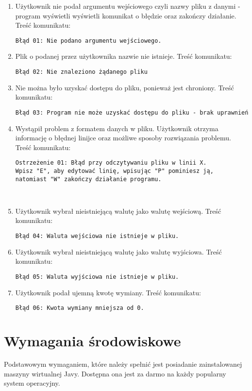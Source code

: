 ﻿\documentclass{article}
\begin{document}
\begin{enumerate}
\item Użytkownik nie podał argumentu wejściowego czyli nazwy pliku z danymi - program wyświetli wyświetli komunikat o błędzie oraz zakończy działanie. Treść komunikatu: \begin{verbatim}Błąd 01: Nie podano argumentu wejściowego.\end{verbatim}
\item Plik o podanej przez użytkownika nazwie nie istnieje. Treść komunikatu: \begin{verbatim}Błąd 02: Nie znaleziono żądanego pliku\end{verbatim}
\item Nie można było uzyskać dostępu do pliku, ponieważ jest chroniony. Treść komunikatu: \begin{verbatim}Błąd 03: Program nie może uzyskać dostępu do pliku - brak uprawnień\end{verbatim}
\item Wystąpił problem z formatem danych w pliku. Użytkownik otrzyma informację o błędnej linijce oraz możliwe sposoby rozwiązania problemu. Treść komunikatu:\begin{verbatim}Ostrzeżenie 01: Błąd przy odczytywaniu pliku w linii X.
Wpisz "E", aby edytować linię, wpisując "P" pominiesz ją,
natomiast "W" zakończy działanie programu. \end{verbatim}
\ \\
\item Użytkownik wybrał nieistniejącą walutę jako walutę wejściową. Treść komunikatu:\begin{verbatim}Błąd 04: Waluta wejściowa nie istnieje w pliku.\end{verbatim}
\item Użytkownik wybrał nieistniejącą walutę jako walutę wyjściowa. Treść komunikatu:\begin{verbatim}Błąd 05: Waluta wyjściowa nie istnieje w pliku.\end{verbatim}
\item Użytkownik podał ujemną kwotę wymiany. Treść komunikatu:\begin{verbatim}Błąd 06: Kwota wymiany mniejsza od 0.\end{verbatim}
\end{enumerate}

\section{Wymagania środowiskowe}
Podstawowym wymaganiem, które należy spełnić jest posiadanie zainstalowanej maszyny wirtualnej Javy. Dostępna ona jest za darmo na każdy popularny system operacyjny.
\end{document}
